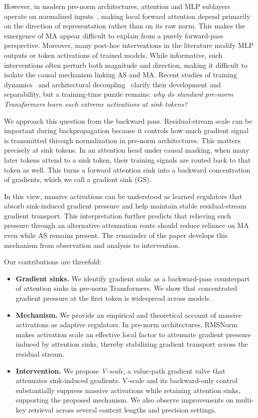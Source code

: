 \documentclass{article}
\theoremstyle{plain}
\theoremstyle{definition}
\theoremstyle{remark}
\begin{document}
However, in modern pre-norm architectures, attention and MLP sublayers operate on normalized inputs~\cite{zhang2019rmsnorm,xiong2020layernorm,touvron2023llama}, making local forward attention depend primarily on the direction of representation rather than on its raw norm. This makes the emergence of MA appear difficult to explain from a purely forward-pass perspective. Moreover, many post-hoc interventions in the literature modify MLP outputs or token activations of trained models. While informative, such interventions often perturb both magnitude and direction, making it difficult to isolate the causal mechanism linking AS and MA. Recent studies of training dynamics~\cite{gallegofeliciano2026hiddendynamics,queipo-de-llano2026attention} and architectural decoupling~\cite{sun2026anatomy} clarify their development and separability, but a training-time puzzle remains: \emph{why do standard pre-norm Transformers learn such extreme activations at sink tokens?}

We approach this question from the backward pass. Residual-stream scale can be important during backpropagation because it controls how much gradient signal is transmitted through normalization in pre-norm architectures. This matters precisely at sink tokens. In an attention head under causal masking, when many later tokens attend to a sink token, their training signals are routed back to that token as well. This turns a forward attention sink into a backward concentration of gradients, which we call a gradient sink (GS).

In this view, massive activations can be understood as learned regulators that absorb sink-induced gradient pressure and help maintain stable residual-stream gradient transport. This interpretation further predicts that relieving such pressure through an alternative attenuation route should reduce reliance on MA even while AS remains present. The remainder of the paper develops this mechanism from observation and analysis to intervention.

Our contributions are threefold:
\begin{itemize}
\item \textbf{Gradient sinks.} We identify gradient sinks as a backward-pass counterpart of attention sinks in pre-norm Transformers. We show that concentrated gradient pressure at the first token is widespread across models.
\item \textbf{Mechanism.} We provide an empirical and theoretical account of massive activations as adaptive regulators. In pre-norm architectures, RMSNorm makes activation scale an effective local factor to attenuate gradient pressure induced by attention sinks, thereby stabilizing gradient transport across the residual stream.
\item \textbf{Intervention.} We propose \emph{V-scale}, a value-path gradient valve that attenuates sink-induced gradients. V-scale and its backward-only control substantially suppress massive activations while retaining attention sinks, supporting the proposed mechanism. We also observe improvements on multi-key retrieval across several context lengths and precision settings.
\end{itemize}
\end{document}
